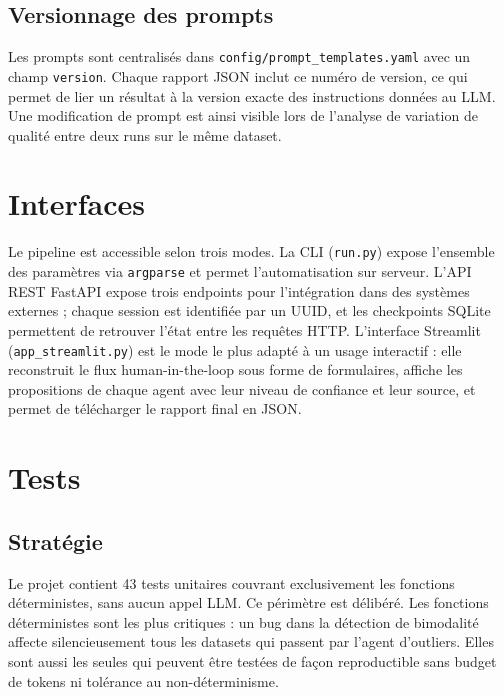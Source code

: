 \documentclass[12pt,a4paper]{article}
\begin{document}
\subsection{Versionnage des prompts}

Les prompts sont centralisés dans \texttt{config/prompt\_templates.yaml} avec un champ
\texttt{version}. Chaque rapport JSON inclut ce numéro de version, ce qui permet de
lier un résultat à la version exacte des instructions données au LLM. Une modification
de prompt est ainsi visible lors de l'analyse de variation de qualité entre deux runs
sur le même dataset.

\section{Interfaces}

Le pipeline est accessible selon trois modes. La CLI (\texttt{run.py}) expose l'ensemble
des paramètres via \texttt{argparse} et permet l'automatisation sur serveur. L'API REST
FastAPI expose trois endpoints pour l'intégration dans des systèmes externes ; chaque
session est identifiée par un UUID, et les checkpoints SQLite permettent de retrouver
l'état entre les requêtes HTTP. L'interface Streamlit (\texttt{app\_streamlit.py}) est
le mode le plus adapté à un usage interactif : elle reconstruit le flux human-in-the-loop
sous forme de formulaires, affiche les propositions de chaque agent avec leur niveau de
confiance et leur source, et permet de télécharger le rapport final en JSON.

\section{Tests}

\subsection{Stratégie}

Le projet contient 43 tests unitaires couvrant exclusivement les fonctions déterministes,
sans aucun appel LLM. Ce périmètre est délibéré. Les fonctions déterministes sont les
plus critiques : un bug dans la détection de bimodalité affecte silencieusement tous les
datasets qui passent par l'agent d'outliers. Elles sont aussi les seules qui peuvent être
testées de façon reproductible sans budget de tokens ni tolérance au non-déterminisme.
\end{document}
